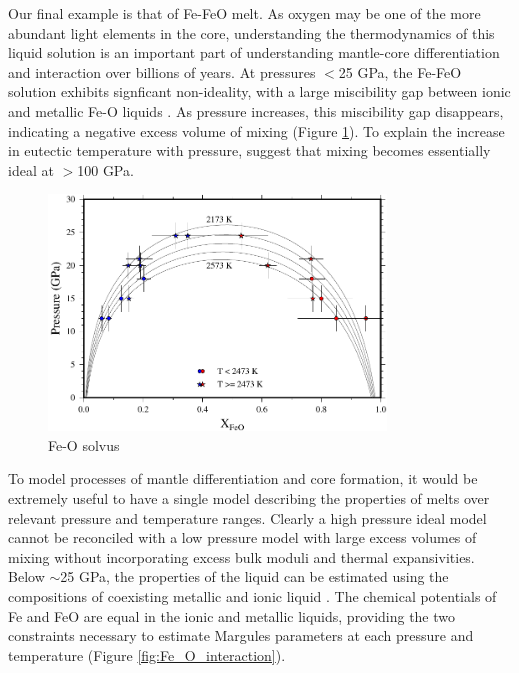 \documentclass[review]{elsarticle}
\begin{document}
Our final example is that of Fe-FeO melt. As oxygen may be one of the more abundant light elements in the core, understanding the thermodynamics of this liquid solution is an important part of understanding mantle-core differentiation and interaction over billions of years. At pressures $<$25 GPa, the Fe-FeO solution exhibits signficant non-ideality, with a large miscibility gap between ionic and metallic Fe-O liquids \citep{KS1995,TOT2007,Frostetal2010}. As pressure increases, this miscibility gap disappears, indicating a negative excess volume of mixing (Figure \ref{fig:Fe_O_solvus}). To explain the increase in eutectic temperature with pressure, \cite{Kom2014} suggest that mixing becomes essentially ideal at $>$100 GPa. 

\begin{figure}[ht!]
  \centering
  \includegraphics[width=0.8\textwidth]{figures/Fe_FeO_solvus}
  \caption{Fe-O solvus}
  \label{fig:Fe_O_solvus}
\end{figure}


To model processes of mantle differentiation and core formation, it would be extremely useful to have a single model describing the properties of melts over relevant pressure and temperature ranges. Clearly a high pressure ideal model cannot be reconciled with a low pressure model with large excess volumes of mixing without incorporating excess bulk moduli and thermal expansivities. Below $\sim$25 GPa, the properties of the liquid can be estimated using the compositions of coexisting metallic and ionic liquid \citep{TOT2007,Frostetal2010}. The chemical potentials of Fe and FeO are equal in the ionic and metallic liquids, providing the two constraints necessary to estimate Margules parameters at each pressure and temperature (Figure \ref{fig:Fe_O_interaction}).
\end{document}
